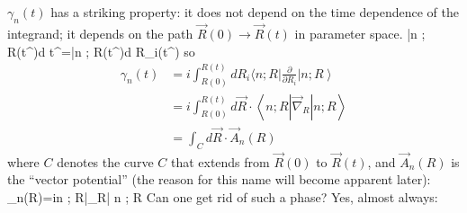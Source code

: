 \documentclass[12pt]{article}
\begin{document}
$\gamma_{n}(t)$ has a striking property: it does not depend
on the time dependence of the integrand; it depends 
on the path $\vec{R}(0) \to \vec{R}(t)$  in parameter space.
\be
{}\left|n ; R\left(t^{\prime}\right)\right\rangle d t^{\prime}=\left|n ; R\left(t^{\prime}\right)\right\rangle d R_{i}\left(t^{\prime}\right)
\ee
so
\begin{align}
\gamma_{n}(t)
&=i \int_{R(0)}^{R(t)} d R_{i}\langle n ; R| \frac{\partial}{\partial R_{i}}\left|n ; R\right\rangle\nonumber\\
&=i \int_{R(0)}^{R(t)} d \vec{R} \cdot\left\langle n ; R\left|\vec{\nabla}_{\!R}\right| n ; R\right\rangle\\
&= \int_{C} d \vec{R} \cdot \vec{A}_{n}(R)
\end{align}
where $C$ denotes the curve $C$ that extends from
$\vec{R}(0)$ to $\vec{R}(t)$, and $\vec{A}_{n}(R)$ is the ``vector
potential'' (the reason for this name will become apparent later):
\be
{}_{n}(R)=i\langle n ; R|\vec{\nabla}_{\!R}| n ; R\rangle
\label{eq:g118}
\ee
Can one get rid of such a phase? Yes, almost always:
\end{document}
